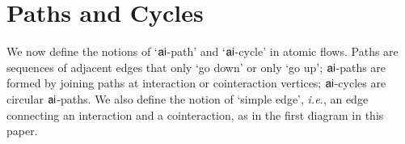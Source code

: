 



\section{Paths and Cycles}\label{section:PathsAndCycles}


We now define the notions of `$\mathsf{ai}$-path' and `$\mathsf{ai}$-cycle' in atomic flows. Paths are sequences of adjacent edges that only `go down' or only `go up'; $\mathsf{ai}$-paths are formed by joining paths at interaction or cointeraction vertices; $\mathsf{ai}$-cycles are circular $\mathsf{ai}$-paths. We also define the notion of `simple edge', \emph{i.e.}, an edge connecting an interaction and a cointeraction, as in the first diagram in this paper.

